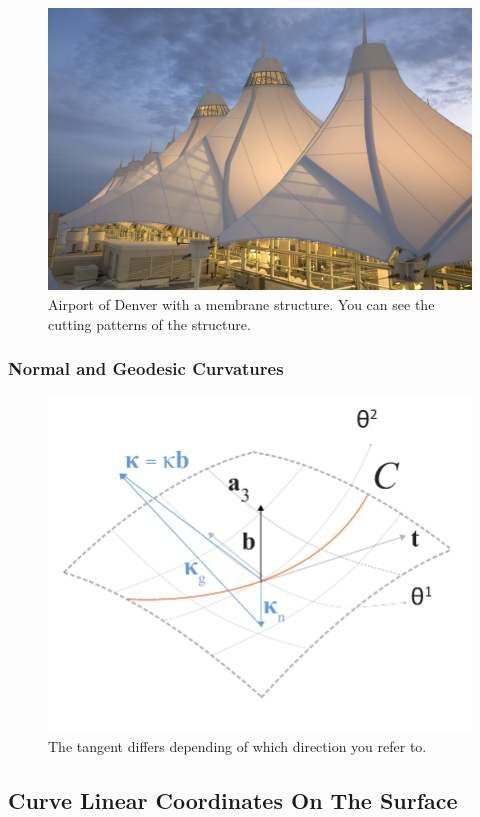 \begin{figure}[H]
\centering
\includegraphics[width=0.9\linewidth ]{figure/Theory/Denver.jpg}

\caption{Airport of Denver with a membrane structure. You can see the cutting patterns of the structure. }
\end{figure}

\subsubsection{Normal and Geodesic Curvatures}

\begin{figure}[H]
\centering
\includegraphics[height=0.6\linewidth ]{figure/Theory/SFF.pdf}
\caption{The tangent differs depending of which direction you refer to. }
\end{figure}

\subsection{Curve Linear Coordinates On The Surface}

